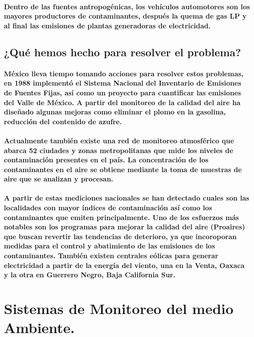     \paragraph {Dentro de las fuentes antropogénicas, los vehículos automotores son los mayores productores de contaminantes, después la quema de gas LP y al final las emisiones de plantas generadoras de  electricidad.}

    \subsection {¿Qué hemos hecho para resolver el problema?}
    \paragraph {México lleva tiempo tomando acciones para resolver estos problemas, en 1988 implementó el Sistema Nacional del Inventario de Emisiones de Fuentes Fijas, así como un proyecto para cuantificar las emisiones del Valle de México. A partir del monitoreo de la calidad del aire ha diseñado algunas mejoras como eliminar el plomo en la gasolina, reducción del contenido de azufre.}

    \paragraph {Actualmente también existe una red de monitoreo atmosférico que abarca 52 ciudades y zonas metropolitanas que mide los niveles de contaminación presentes en el país. La concentración de los contaminantes en el aire se obtiene mediante la toma de muestras de aire que se analizan y procesan.}

    \paragraph {A partir de estas mediciones nacionales se han detectado cuales son las localidades con mayor índices de contaminación así como los contaminantes que emiten principalmente.  Uno de los esfuerzos más notables son los programas para mejorar la calidad del aire (Proaires) que buscan revertir las tendencias de deterioro, ya que incoroporan medidas para el control y abatimiento de las emisiones de los contaminantes.  También existen centrales eólicas para generar electricidad a partir de la energía del viento, una en la Venta, Oaxaca y la otra en Guerrero Negro, Baja California Sur.}

  \section {Sistemas de Monitoreo del medio Ambiente.}
